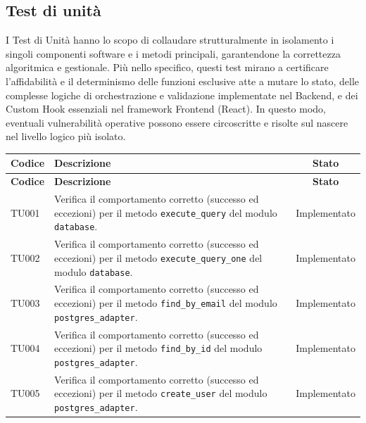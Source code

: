 \documentclass[a4paper,11pt,oneside]{scrartcl}
\begin{document}
\subsection{Test di unità}
I Test di Unità hanno lo scopo di collaudare strutturalmente in isolamento i singoli componenti software e i metodi principali, garantendone la correttezza algoritmica e gestionale. Più nello specifico, questi test mirano a certificare l'affidabilità e il determinismo delle funzioni esclusive atte a mutare lo stato, delle complesse logiche di orchestrazione e validazione implementate nel Backend, e dei Custom Hook essenziali nel framework Frontend (React). In questo modo, eventuali vulnerabilità operative possono essere circoscritte e risolte sul nascere nel livello logico più isolato.
\begin{longtable}{|p{1.9cm}|p{11.6cm}|c|}
    \hline
    \rowcolor[gray]{0.9}
    \textbf{Codice} & \textbf{Descrizione}                                                                                                                                         & \textbf{Stato} \\
    \hline
    \endfirsthead
    \hline
    \rowcolor[gray]{0.9}
    \textbf{Codice} & \textbf{Descrizione}                                                                                                                                         & \textbf{Stato} \\
    \hline
    \endhead
    TU001           & Verifica il comportamento corretto (successo ed eccezioni) per il metodo \texttt{execute\_query} del modulo \texttt{database}.                               & Implementato   \\ \hline
    TU002           & Verifica il comportamento corretto (successo ed eccezioni) per il metodo \texttt{execute\_query\_one} del modulo \texttt{database}.                          & Implementato   \\ \hline
    TU003           & Verifica il comportamento corretto (successo ed eccezioni) per il metodo \texttt{find\_by\_email} del modulo \texttt{postgres\_adapter}.                     & Implementato   \\ \hline
    TU004           & Verifica il comportamento corretto (successo ed eccezioni) per il metodo \texttt{find\_by\_id} del modulo \texttt{postgres\_adapter}.                        & Implementato   \\ \hline
    TU005           & Verifica il comportamento corretto (successo ed eccezioni) per il metodo \texttt{create\_user} del modulo \texttt{postgres\_adapter}.                        & Implementato   \\ \hline

\end{longtable}
\end{document}
